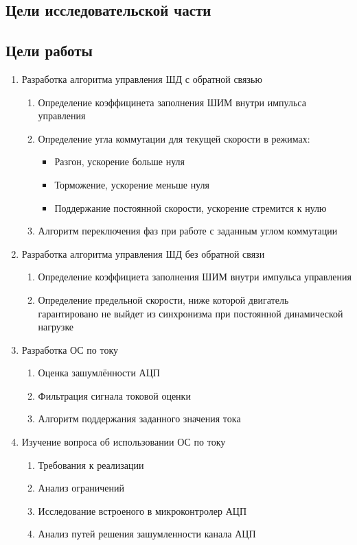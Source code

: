 \ifdefined\DIPLOMA
    \subsection{Цели исследовательской части}
\else
    \subsection{Цели работы}
\fi

\begin{enumerate}
    \item{Разработка алгоритма управления ШД с обратной связью}
    \begin{enumerate}
        \item Определение коэффицинета заполнения ШИМ внутри импульса управления
        \item Определение угла коммутации для текущей скорости в режимах:
            \begin{itemize}
                \item Разгон, ускорение больше нуля
                \item Торможение, ускорение меньше нуля
                \item Поддержание постоянной скорости, ускорение стремится к нулю
            \end{itemize}
        \item Алгоритм переключения фаз при работе с заданным углом коммутации
    \end{enumerate}

    \item{Разработка алгоритма управления ШД без обратной связи}
        \begin{enumerate}
            \item Определение коэффициета заполнения ШИМ внутри импульса управления
            \item Определение предельной скорости, ниже которой двигатель гарантировано не выйдет из
                синхронизма при постоянной динамической нагрузке
        \end{enumerate}

\ifdefined\DIPLOMA
    \item{Разработка ОС по току}
        \begin{enumerate}
            \item Оценка зашумлённости АЦП
            \item Фильтрация сигнала токовой оценки
            \item Алгоритм поддержания заданного значения тока
        \end{enumerate}
\else
    \item{Изучение вопроса об использовании ОС по току}
        \begin{enumerate}
            \item Требования к реализации
            \item Анализ ограничений
            \item Исследование встроеного в микроконтролер АЦП
            \item Анализ путей решения зашумленности канала АЦП
        \end{enumerate}
\fi


\end{enumerate}

